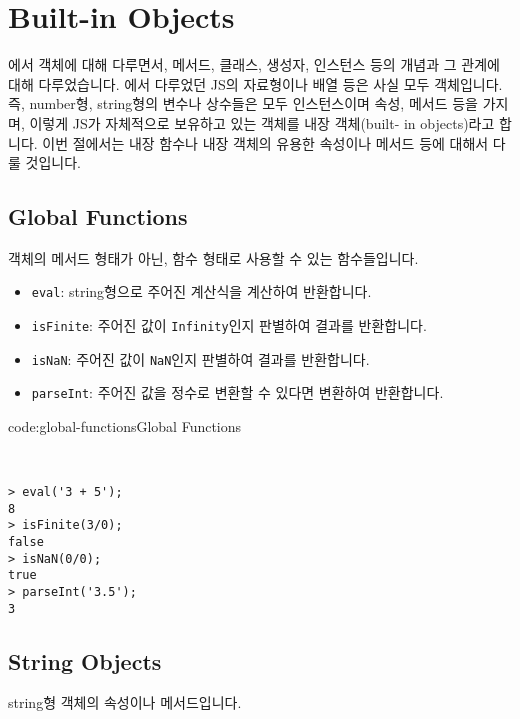 \section{Built-in Objects} \label{sect:built-in-objects}

에서 객체에 대해 다루면서, 메서드, 클래스, 생성자, 인스턴스 등의 개념과 그 관계에 대해 다루었습니다. 에서 다루었던 JS의 자료형이나 배열 등은 사실 모두 객체입니다. 즉, number형, string형의 변수나 상수들은 모두 인스턴스이며 속성, 메서드 등을 가지며, 이렇게 JS가 자체적으로 보유하고 있는 객체를 내장 객체(built- in objects)라고 합니다. 이번 절에서는 내장 함수나 내장 객체의 유용한 속성이나 메서드 등에 대해서 다룰 것입니다. 

\subsection*{Global Functions}

객체의 메서드 형태가 아닌, 함수 형태로 사용할 수 있는 함수들입니다.

\begin{itemize}
    \item \verb|eval|: string형으로 주어진 계산식을 계산하여 반환합니다. 
    \item \verb|isFinite|: 주어진 값이 \verb|Infinity|인지 판별하여 결과를 반환합니다. 
    \item \verb|isNaN|: 주어진 값이 \verb|NaN|인지 판별하여 결과를 반환합니다. 
    \item \verb|parseInt|: 주어진 값을 정수로 변환할 수 있다면 변환하여 반환합니다. 
\end{itemize}

\begin{codeenv}{code:global-functions}{Global Functions}\begin{verbatim}


> eval('3 + 5');
8
> isFinite(3/0);
false
> isNaN(0/0);
true
> parseInt('3.5');
3
\end{verbatim}
\end{codeenv}

\subsection*{String Objects}

string형 객체의 속성이나 메서드입니다.

